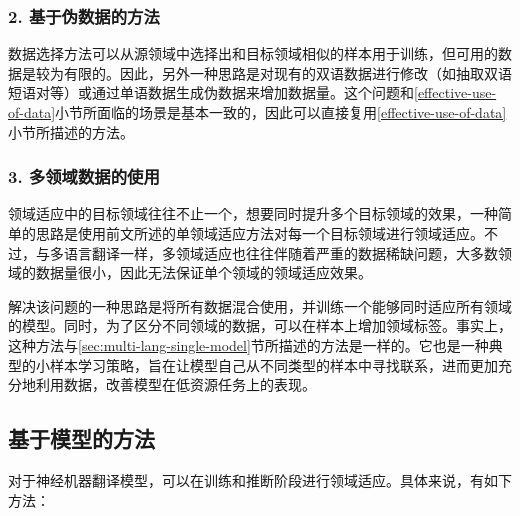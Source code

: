 \subsubsection{2. 基于伪数据的方法}

\parinterval 数据选择方法可以从源领域中选择出和目标领域相似的样本用于训练，但可用的数据是较为有限的。因此，另外一种思路是对现有的双语数据进行修改（如抽取双语短语对等）或通过单语数据生成伪数据来增加数据量。这个问题和\ref{effective-use-of-data}小节所面临的场景是基本一致的，因此可以直接复用\ref{effective-use-of-data}小节所描述的方法。

\subsubsection{3. 多领域数据的使用}

\parinterval 领域适应中的目标领域往往不止一个，想要同时提升多个目标领域的效果，一种简单的思路是使用前文所述的单领域适应方法对每一个目标领域进行领域适应。不过，与多语言翻译一样，多领域适应也往往伴随着严重的数据稀缺问题，大多数领域的数据量很小，因此无法保证单个领域的领域适应效果。

\parinterval 解决该问题的一种思路是将所有数据混合使用，并训练一个能够同时适应所有领域的模型。同时，为了区分不同领域的数据，可以在样本上增加领域标签。事实上，这种方法与\ref{sec:multi-lang-single-model}节所描述的方法是一样的。它也是一种典型的小样本学习策略，旨在让模型自己从不同类型的样本中寻找联系，进而更加充分地利用数据，改善模型在低资源任务上的表现。


\subsection{基于模型的方法}\label{domain-adaptation-modeling-methods}

\parinterval 对于神经机器翻译模型，可以在训练和推断阶段进行领域适应。具体来说，有如下方法：


